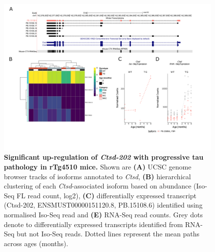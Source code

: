 \begin{landscape}
	\begin{figure}[!htp]
		\centering
		\includegraphics[page=1,trim={1.5cm 2.5cm 2cm 2cm}, scale = 0.85]{Figures/Ch5_DiffPlots_Landscape.pdf}
		\captionsetup{width=1.5\textwidth}
		\caption[Differential \textit{Ctsd} transcript expression]%
		{\textbf{Significant up-regulation of \textit{Ctsd-202} with progressive tau pathology in rTg4510 mice.} Shown are \textbf{(A)} UCSC genome browser tracks of isoforms annotated to \textit{Ctsd}, \textbf{(B)} hierarchical clustering of each \textit{Ctsd}-associated isoform based on abundance (Iso-Seq FL read count, log2), \textbf{(C)} differentially expressed transcript (Ctsd-202, ENSMUST00000151120.8, PB.15108.6) identified using normalised Iso-Seq read and \textbf{(E)} RNA-Seq read counts. Grey dots denote to differentially expressed transcripts identified from RNA-Seq but not Iso-Seq reads. Dotted lines represent the mean paths across ages (months).}   
		\label{fig:Ctsd}
	\end{figure}	
\end{landscape}

